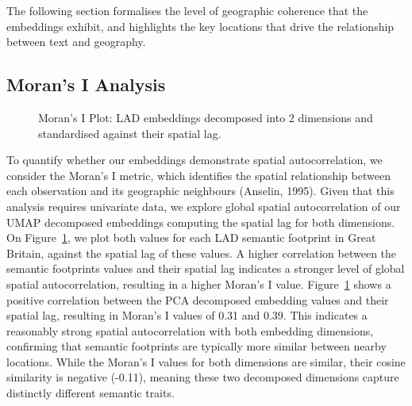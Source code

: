 \documentclass[
]{article}
\begin{document}
The following section formalises the level of geographic coherence that
the embeddings exhibit, and highlights the key locations that drive the
relationship between text and geography.

\subsection{Moran's I Analysis}\label{morans-i-analysis}

\begin{figure}


\caption{\label{fig-morans}Moran's I Plot: LAD embeddings decomposed
into 2 dimensions and standardised against their spatial lag.}

\end{figure}%

To quantify whether our embeddings demonstrate spatial autocorrelation,
we consider the Moran's I metric, which identifies the spatial
relationship between each observation and its geographic neighbours
(Anselin, 1995). Given that this analysis requires univariate data, we
explore global spatial autocorrelation of our UMAP decomposed embeddings
computing the spatial lag for both dimensions. On
Figure~\ref{fig-morans}, we plot both values for each LAD semantic
footprint in Great Britain, against the spatial lag of these values. A
higher correlation between the semantic footprints values and their
spatial lag indicates a stronger level of global spatial
autocorrelation, resulting in a higher Moran's I value.
Figure~\ref{fig-morans} shows a positive correlation between the PCA
decomposed embedding values and their spatial lag, resulting in Moran's
I values of 0.31 and 0.39. This indicates a reasonably strong spatial
autocorrelation with both embedding dimensions, confirming that semantic
footprints are typically more similar between nearby locations. While
the Moran's I values for both dimensions are similar, their cosine
similarity is negative (-0.11), meaning these two decomposed dimensions
capture distinctly different semantic traits.
\end{document}
